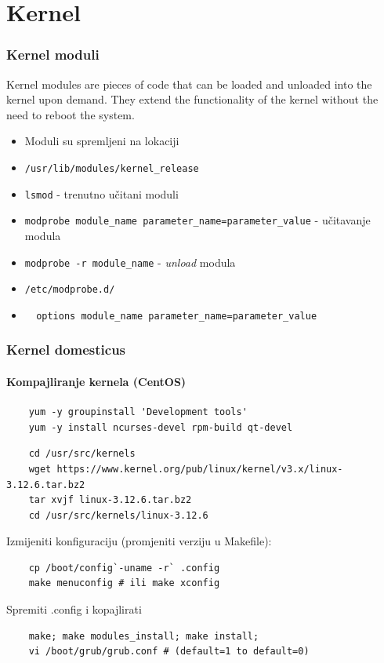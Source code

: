 \documentclass[t]{beamer}
\begin{document}
\section{Kernel}
\begin{frame}[fragile]
	\frametitle{Kernel moduli}
	Kernel modules are pieces of code that can be loaded and unloaded into the kernel upon demand. They extend the functionality of the kernel without the need to reboot the system.
	\begin{itemize}
		\item Moduli su spremljeni na lokaciji
		\item[] \verb|/usr/lib/modules/kernel_release|
	\end{itemize}
	\begin{itemize}
		\item \texttt{lsmod} - trenutno učitani moduli
		\item \texttt{modprobe module\_name parameter\_name=parameter\_value} - učitavanje modula
		\item \texttt{modprobe -r module\_name} - \textit{unload} modula
	\end{itemize}
	\begin{itemize}
		\item[] \verb|/etc/modprobe.d/|
		\item[] \verb|  options module_name parameter_name=parameter_value|
	\end{itemize}
\end{frame}
\begin{frame}[fragile]
	\frametitle{Kernel domesticus}
	\framesubtitle{Kompajliranje kernela (CentOS)}
    \footnotesize
    \begin{verbatim}
	yum -y groupinstall 'Development tools'
	yum -y install ncurses-devel rpm-build qt-devel
	\end{verbatim}
	\begin{verbatim}
	cd /usr/src/kernels
	wget https://www.kernel.org/pub/linux/kernel/v3.x/linux-3.12.6.tar.bz2
	tar xvjf linux-3.12.6.tar.bz2
	cd /usr/src/kernels/linux-3.12.6
	\end{verbatim}
	Izmijeniti konfiguraciju (promjeniti verziju u Makefile):
	\begin{verbatim}
	cp /boot/config`-uname -r` .config
	make menuconfig # ili make xconfig
	\end{verbatim}
	Spremiti .config i kopajlirati
	\begin{verbatim}
	make; make modules_install; make install;
	vi /boot/grub/grub.conf # (default=1 to default=0)
	\end{verbatim}
\end{frame}
\end{document}
